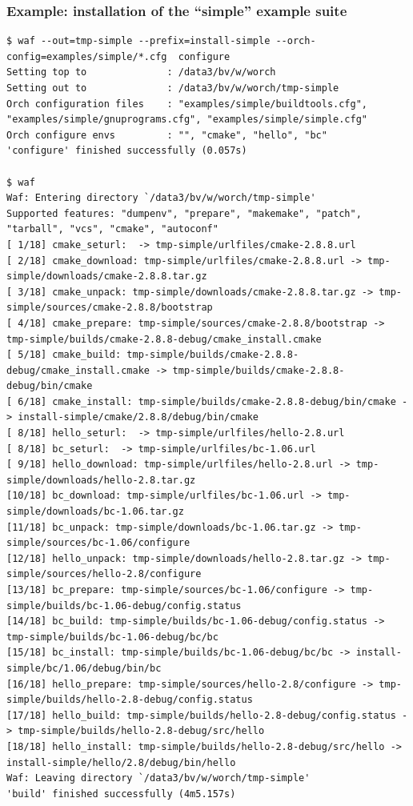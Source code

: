 \documentclass[xcolor=dvipsnames]{beamer}
\begin{document}
\begin{frame}[fragile]
  \frametitle{Example: installation of the ``simple'' example suite}
{\tiny
\begin{verbatim}
$ waf --out=tmp-simple --prefix=install-simple --orch-config=examples/simple/*.cfg  configure
Setting top to              : /data3/bv/w/worch 
Setting out to              : /data3/bv/w/worch/tmp-simple 
Orch configuration files    : "examples/simple/buildtools.cfg", "examples/simple/gnuprograms.cfg", "examples/simple/simple.cfg" 
Orch configure envs         : "", "cmake", "hello", "bc" 
'configure' finished successfully (0.057s)

$ waf
Waf: Entering directory `/data3/bv/w/worch/tmp-simple'
Supported features: "dumpenv", "prepare", "makemake", "patch", "tarball", "vcs", "cmake", "autoconf"
[ 1/18] cmake_seturl:  -> tmp-simple/urlfiles/cmake-2.8.8.url
[ 2/18] cmake_download: tmp-simple/urlfiles/cmake-2.8.8.url -> tmp-simple/downloads/cmake-2.8.8.tar.gz
[ 3/18] cmake_unpack: tmp-simple/downloads/cmake-2.8.8.tar.gz -> tmp-simple/sources/cmake-2.8.8/bootstrap
[ 4/18] cmake_prepare: tmp-simple/sources/cmake-2.8.8/bootstrap -> tmp-simple/builds/cmake-2.8.8-debug/cmake_install.cmake
[ 5/18] cmake_build: tmp-simple/builds/cmake-2.8.8-debug/cmake_install.cmake -> tmp-simple/builds/cmake-2.8.8-debug/bin/cmake
[ 6/18] cmake_install: tmp-simple/builds/cmake-2.8.8-debug/bin/cmake -> install-simple/cmake/2.8.8/debug/bin/cmake
[ 8/18] hello_seturl:  -> tmp-simple/urlfiles/hello-2.8.url
[ 8/18] bc_seturl:  -> tmp-simple/urlfiles/bc-1.06.url
[ 9/18] hello_download: tmp-simple/urlfiles/hello-2.8.url -> tmp-simple/downloads/hello-2.8.tar.gz
[10/18] bc_download: tmp-simple/urlfiles/bc-1.06.url -> tmp-simple/downloads/bc-1.06.tar.gz
[11/18] bc_unpack: tmp-simple/downloads/bc-1.06.tar.gz -> tmp-simple/sources/bc-1.06/configure
[12/18] hello_unpack: tmp-simple/downloads/hello-2.8.tar.gz -> tmp-simple/sources/hello-2.8/configure
[13/18] bc_prepare: tmp-simple/sources/bc-1.06/configure -> tmp-simple/builds/bc-1.06-debug/config.status
[14/18] bc_build: tmp-simple/builds/bc-1.06-debug/config.status -> tmp-simple/builds/bc-1.06-debug/bc/bc
[15/18] bc_install: tmp-simple/builds/bc-1.06-debug/bc/bc -> install-simple/bc/1.06/debug/bin/bc
[16/18] hello_prepare: tmp-simple/sources/hello-2.8/configure -> tmp-simple/builds/hello-2.8-debug/config.status
[17/18] hello_build: tmp-simple/builds/hello-2.8-debug/config.status -> tmp-simple/builds/hello-2.8-debug/src/hello
[18/18] hello_install: tmp-simple/builds/hello-2.8-debug/src/hello -> install-simple/hello/2.8/debug/bin/hello
Waf: Leaving directory `/data3/bv/w/worch/tmp-simple'
'build' finished successfully (4m5.157s)
\end{verbatim}
}
\end{frame}
\end{document}
